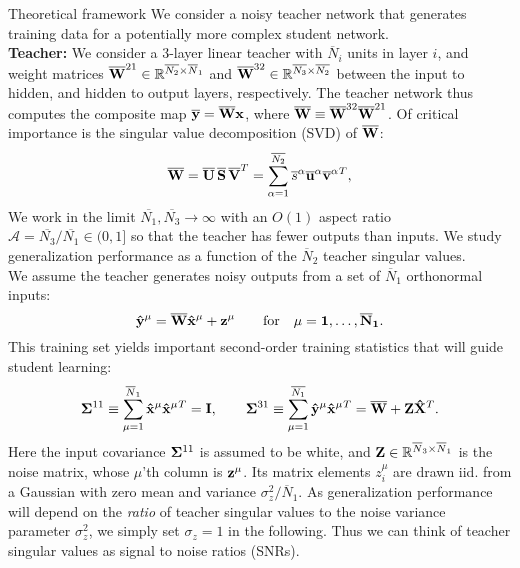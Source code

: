 \documentclass[final]{beamer}
\newcommand{\R}{\mathbb{R}}
\newcommand{\bb}[1]{{\bf\overline{#1}}}
\newcommand{\bh}[1]{{\bf\hat{#1}}}
\begin{document}
\begin{frame}[t]{}
\begin{columns}
\begin{column}[t]{0.248\textwidth}
\begin{block}{\large Theoretical framework}
We consider a noisy teacher network that generates training data for a potentially more complex student network. \\[0.5em] 
\textbf{Teacher:} We consider a 3-layer linear teacher with \(\overline{N}_i\) units in layer \(i\), and weight matrices \({\bf\overline{W}}^{21} \in \R^{\overline{N_2} \times \overline{N}_1}\) and \({\bf\overline{W}}^{32} \in \R^{\overline{N_3} \times \overline{N_2}}\) between the input to hidden, and hidden to output layers, respectively. 
The teacher network thus computes the composite map \(\bb{y} = \bb{W} \bf{x}\), where \( \bb{W} \equiv \bb{W}^{32}\bb{W}^{21} \). Of critical importance is the singular value decomposition (SVD) of \(\bb{W}\):
\begin{equation}
\bb{W} = \bb{U}\,\bb{S}\,\bb{V}^T = \sum_{\alpha=1}^{\overline{N_2}} \overline{s}^\alpha \bb{u}^\alpha \bb{v}^\alpha{}^T,
\label{eq:teachersvd}
\end{equation}
We work in the limit $\overline{N_1}, \overline{N_3} \rightarrow \infty$ with an $O(1)$ aspect ratio $\mathcal{A}=\overline{N_3}/\overline{N_1} \in (0,1]$ so that the teacher has fewer outputs than inputs. We study generalization performance as a function of the \(\overline{N}_2\) teacher singular values. \\[10pt] 
We assume the teacher generates noisy outputs from a set of \(\overline{N}_1\) orthonormal inputs:
\begin{equation}
\bh{y}^{\mu} = \bb{W}\bh{x}^\mu + \bf{z} ^ \mu \qquad \text{for} \quad \mu = 1, \dots, \overline{N}_1.
\label{eq:traindata}
\end{equation}
This training set yields important second-order training statistics that will guide student learning:
\begin{equation}
{\bf\Sigma}^{11} \equiv \sum_{\mu=1}^{\overline{N}_1} {\bh x}^\mu {\bh x}^\mu{}^T = {\bf I},
\qquad
{\bf \Sigma}^{31} \equiv \sum_{\mu=1}^{\overline{N_1}} \bh{y}^\mu {\bh x}^\mu{}^T = \bb{W} + {\bf Z}{\bh X}^T.
\label{eq:secondorder}
\end{equation}
Here the input covariance \({\bf\Sigma}^{11}\) is assumed to be white, and \({\bf Z} \in \R^{\overline{N}_3 \times \overline{N}_1}\) is the noise matrix, whose $\mu$'th column is $\bf{z}^\mu$. Its matrix elements \(z^\mu_i\) are drawn iid. from a Gaussian with zero mean and variance \(\sigma_z^2 / {\overline{N}_1}\). As generalization performance will depend on the {\it ratio} of teacher singular values to the noise variance parameter $\sigma^2_z$, we simply set $\sigma_z=1$ in the following. Thus we can think of teacher singular values as signal to noise ratios (SNRs). \\[0.5em]

\end{block}
\end{column}
\end{columns}
\end{frame}
\end{document}
